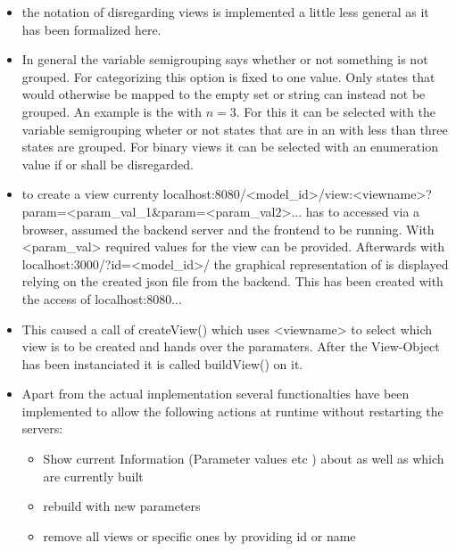 \documentclass[preview]{standalone}
\begin{document}
\begin{itemize}
	\item the notation of disregarding views is implemented a little less general as it has been formalized here.
	\item In general the variable semigrouping says whether or not something is not grouped. For categorizing \viewsN this option is fixed to one value. Only states that would otherwise be mapped to the empty set or string can instead not be grouped. An example is the \viewN \viewscc with $n = 3$. For this \viewN it can be selected with the variable semigrouping wheter or not states that are in an \sccN with less than three states are grouped. For binary views it can be selected with an enumeration value if \hasppty or \notppty shall be disregarded.
	
	\item to create a view currenty localhost:8080/<model\_id>/view:<viewname>?param=<param\_val\_1\&param=<param\_val2>... has to accessed via a browser, assumed the backend server and the frontend to be running. With <param\_val> required values for the view can be provided. Afterwards with localhost:3000/?id=<model\_id>/ the graphical representation of \viewN is displayed relying on the created json file from the backend. This has been created with the access of localhost:8080...
	\item This caused a call of createView() which uses <viewname> to select which view is to be created and hands over the paramaters. After the View-Object has been instanciated it is called buildView() on it.
	\item Apart from the actual implementation several functionalties have been implemented to allow the following actions at runtime without restarting the servers:
	\begin{itemize}
		\item Show current Information (Parameter values etc ) about \viewN as well as which \viewsN are currently built
		\item rebuild \viewN with new parameters
		\item remove all views or specific ones by providing id or name		
	\end{itemize}
	

\end{itemize}
\end{document}
